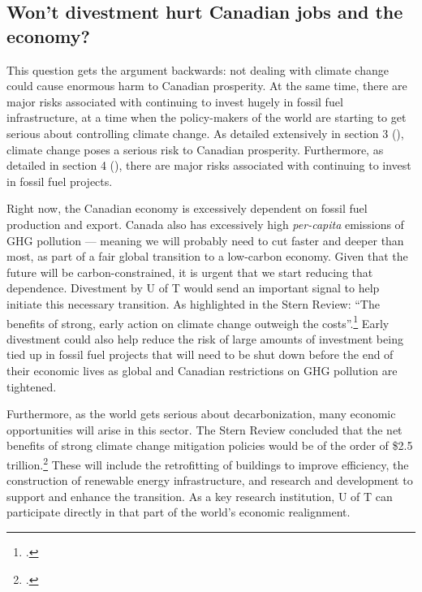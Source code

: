 \documentclass[10pt]{article}
\begin{document}
	\subsection{Won't divestment hurt Canadian jobs and the economy?}
	\label{CanadianJobsEconomy}
	
	

This question gets the argument backwards: not dealing with climate change could cause enormous harm to Canadian prosperity.
At the same time, there are major risks associated with continuing to invest hugely in fossil fuel infrastructure, at a time when the policy-makers of the world are starting to get serious about controlling climate change.
As detailed extensively in section 3 (), climate change poses a serious risk to Canadian prosperity. 
Furthermore, as detailed in section 4 (), there are major risks associated with continuing to invest in fossil fuel projects.


Right now, the Canadian economy is excessively dependent on fossil fuel production and export.
Canada also has excessively high \emph{per-capita} emissions of GHG pollution --- meaning we will probably need to cut faster and deeper than most, as part of a fair global transition to a low-carbon economy.
Given that the future will be carbon-constrained, it is urgent that we start reducing that dependence.
Divestment by U of T would send an important signal to help initiate this necessary transition.
As highlighted in the Stern Review: ``The benefits of strong, early action on climate change outweigh the costs''.\footcite[][p. i]{Stern2007}
Early divestment could also help reduce the risk of large amounts of investment being tied up in fossil fuel projects that will need to be shut down before the end of their economic lives as global and Canadian restrictions on GHG pollution are tightened.



Furthermore, as the world gets serious about decarbonization, many economic opportunities will arise in this sector.
The Stern Review concluded that the net benefits of strong climate change mitigation policies would be of the order of \$2.5 trillion.\footcite[][p. xvii]{Stern2007}
These will include the retrofitting of buildings to improve efficiency, the construction of renewable energy infrastructure, and research and development to support and enhance the transition.
As a key research institution, U of T can participate directly in that part of the world's economic realignment.
\end{document}
